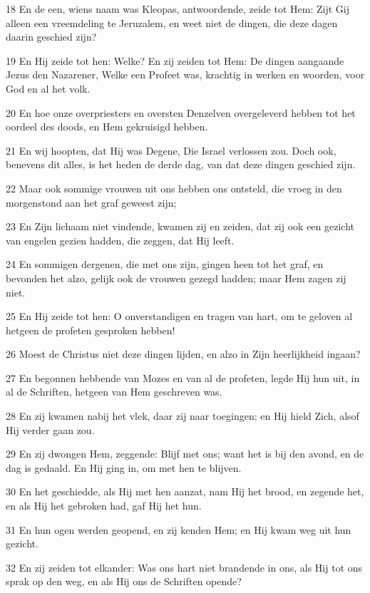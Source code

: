 \par 18 En de een, wiens naam was Kleopas, antwoordende, zeide tot Hem: Zijt Gij alleen een vreemdeling te Jeruzalem, en weet niet de dingen, die deze dagen daarin geschied zijn?
\par 19 En Hij zeide tot hen: Welke? En zij zeiden tot Hem: De dingen aangaande Jezus den Nazarener, Welke een Profeet was, krachtig in werken en woorden, voor God en al het volk.
\par 20 En hoe onze overpriesters en oversten Denzelven overgeleverd hebben tot het oordeel des doods, en Hem gekruisigd hebben.
\par 21 En wij hoopten, dat Hij was Degene, Die Israel verlossen zou. Doch ook, benevens dit alles, is het heden de derde dag, van dat deze dingen geschied zijn.
\par 22 Maar ook sommige vrouwen uit ons hebben ons ontsteld, die vroeg in den morgenstond aan het graf geweest zijn;
\par 23 En Zijn lichaam niet vindende, kwamen zij en zeiden, dat zij ook een gezicht van engelen gezien hadden, die zeggen, dat Hij leeft.
\par 24 En sommigen dergenen, die met ons zijn, gingen heen tot het graf, en bevonden het alzo, gelijk ook de vrouwen gezegd hadden; maar Hem zagen zij niet.
\par 25 En Hij zeide tot hen: O onverstandigen en tragen van hart, om te geloven al hetgeen de profeten gesproken hebben!
\par 26 Moest de Christus niet deze dingen lijden, en alzo in Zijn heerlijkheid ingaan?
\par 27 En begonnen hebbende van Mozes en van al de profeten, legde Hij hun uit, in al de Schriften, hetgeen van Hem geschreven was.
\par 28 En zij kwamen nabij het vlek, daar zij naar toegingen; en Hij hield Zich, alsof Hij verder gaan zou.
\par 29 En zij dwongen Hem, zeggende: Blijf met ons; want het is bij den avond, en de dag is gedaald. En Hij ging in, om met hen te blijven.
\par 30 En het geschiedde, als Hij met hen aanzat, nam Hij het brood, en zegende het, en als Hij het gebroken had, gaf Hij het hun.
\par 31 En hun ogen werden geopend, en zij kenden Hem; en Hij kwam weg uit hun gezicht.
\par 32 En zij zeiden tot elkander: Was ons hart niet brandende in ons, als Hij tot ons sprak op den weg, en als Hij ons de Schriften opende?

